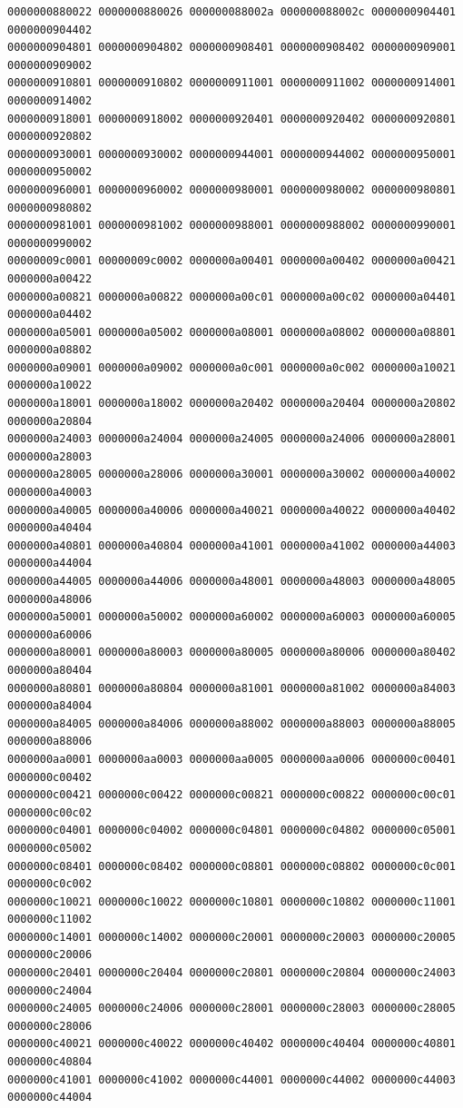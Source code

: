 \begin{Verbatim}[fontsize=\scriptsize]
0000000880022 0000000880026 000000088002a 000000088002c 0000000904401 0000000904402
0000000904801 0000000904802 0000000908401 0000000908402 0000000909001 0000000909002
0000000910801 0000000910802 0000000911001 0000000911002 0000000914001 0000000914002
0000000918001 0000000918002 0000000920401 0000000920402 0000000920801 0000000920802
0000000930001 0000000930002 0000000944001 0000000944002 0000000950001 0000000950002
0000000960001 0000000960002 0000000980001 0000000980002 0000000980801 0000000980802
0000000981001 0000000981002 0000000988001 0000000988002 0000000990001 0000000990002
00000009c0001 00000009c0002 0000000a00401 0000000a00402 0000000a00421 0000000a00422
0000000a00821 0000000a00822 0000000a00c01 0000000a00c02 0000000a04401 0000000a04402
0000000a05001 0000000a05002 0000000a08001 0000000a08002 0000000a08801 0000000a08802
0000000a09001 0000000a09002 0000000a0c001 0000000a0c002 0000000a10021 0000000a10022
0000000a18001 0000000a18002 0000000a20402 0000000a20404 0000000a20802 0000000a20804
0000000a24003 0000000a24004 0000000a24005 0000000a24006 0000000a28001 0000000a28003
0000000a28005 0000000a28006 0000000a30001 0000000a30002 0000000a40002 0000000a40003
0000000a40005 0000000a40006 0000000a40021 0000000a40022 0000000a40402 0000000a40404
0000000a40801 0000000a40804 0000000a41001 0000000a41002 0000000a44003 0000000a44004
0000000a44005 0000000a44006 0000000a48001 0000000a48003 0000000a48005 0000000a48006
0000000a50001 0000000a50002 0000000a60002 0000000a60003 0000000a60005 0000000a60006
0000000a80001 0000000a80003 0000000a80005 0000000a80006 0000000a80402 0000000a80404
0000000a80801 0000000a80804 0000000a81001 0000000a81002 0000000a84003 0000000a84004
0000000a84005 0000000a84006 0000000a88002 0000000a88003 0000000a88005 0000000a88006
0000000aa0001 0000000aa0003 0000000aa0005 0000000aa0006 0000000c00401 0000000c00402
0000000c00421 0000000c00422 0000000c00821 0000000c00822 0000000c00c01 0000000c00c02
0000000c04001 0000000c04002 0000000c04801 0000000c04802 0000000c05001 0000000c05002
0000000c08401 0000000c08402 0000000c08801 0000000c08802 0000000c0c001 0000000c0c002
0000000c10021 0000000c10022 0000000c10801 0000000c10802 0000000c11001 0000000c11002
0000000c14001 0000000c14002 0000000c20001 0000000c20003 0000000c20005 0000000c20006
0000000c20401 0000000c20404 0000000c20801 0000000c20804 0000000c24003 0000000c24004
0000000c24005 0000000c24006 0000000c28001 0000000c28003 0000000c28005 0000000c28006
0000000c40021 0000000c40022 0000000c40402 0000000c40404 0000000c40801 0000000c40804
0000000c41001 0000000c41002 0000000c44001 0000000c44002 0000000c44003 0000000c44004

\end{Verbatim}

